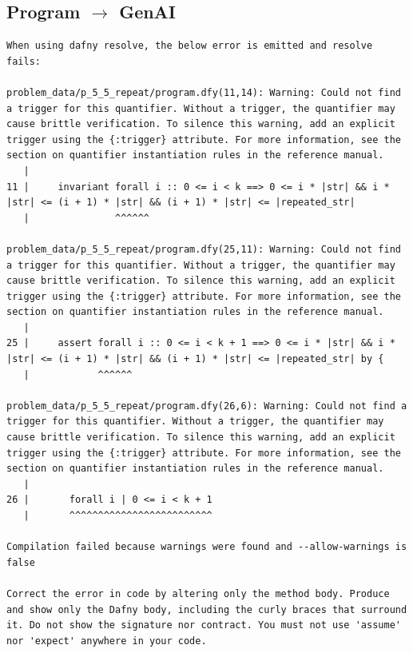 \documentclass{article}
\begin{document}
\subsection*{Program $\rightarrow$ GenAI}
\begin{lstlisting}
When using dafny resolve, the below error is emitted and resolve fails:

problem_data/p_5_5_repeat/program.dfy(11,14): Warning: Could not find a trigger for this quantifier. Without a trigger, the quantifier may cause brittle verification. To silence this warning, add an explicit trigger using the {:trigger} attribute. For more information, see the section on quantifier instantiation rules in the reference manual.
   |
11 |     invariant forall i :: 0 <= i < k ==> 0 <= i * |str| && i * |str| <= (i + 1) * |str| && (i + 1) * |str| <= |repeated_str|
   |               ^^^^^^

problem_data/p_5_5_repeat/program.dfy(25,11): Warning: Could not find a trigger for this quantifier. Without a trigger, the quantifier may cause brittle verification. To silence this warning, add an explicit trigger using the {:trigger} attribute. For more information, see the section on quantifier instantiation rules in the reference manual.
   |
25 |     assert forall i :: 0 <= i < k + 1 ==> 0 <= i * |str| && i * |str| <= (i + 1) * |str| && (i + 1) * |str| <= |repeated_str| by {
   |            ^^^^^^

problem_data/p_5_5_repeat/program.dfy(26,6): Warning: Could not find a trigger for this quantifier. Without a trigger, the quantifier may cause brittle verification. To silence this warning, add an explicit trigger using the {:trigger} attribute. For more information, see the section on quantifier instantiation rules in the reference manual.
   |
26 |       forall i | 0 <= i < k + 1
   |       ^^^^^^^^^^^^^^^^^^^^^^^^^

Compilation failed because warnings were found and --allow-warnings is false

Correct the error in code by altering only the method body. Produce and show only the Dafny body, including the curly braces that surround it. Do not show the signature nor contract. You must not use 'assume' nor 'expect' anywhere in your code.
\end{lstlisting}
\end{document}
